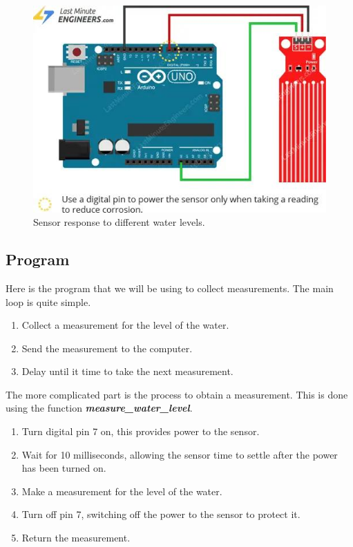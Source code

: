 \documentclass[12pt]{article}
\begin{document}
\begin{figure}[H]
	\begin{center}
		\includegraphics[scale=0.55]{circuit_water_sensor_basic}
		\caption{Sensor response to different water levels.}
		\label{circuit:water_sensor_basic}
	\end{center}
\end{figure}














\subsection{Program}

Here is the program that we will be using to collect measurements. The main loop is quite simple.

\begin{enumerate}
	\itemsep -1em
	\item Collect a measurement for the level of the water.
	\item Send the measurement to the computer.
	\item Delay until it time to take the next measurement.
\end{enumerate}

The more complicated part is the process to obtain a measurement. This is done using the function \textbf{\textit{ measure\_water\_level}}.

\begin{enumerate}
	\itemsep -1em
	\item Turn digital pin 7 on, this provides power to the sensor.
	\item Wait for 10 milliseconds, allowing the sensor time to settle after the power has been turned on.
	\item Make a measurement for the level of the water.
	\item Turn off pin 7, switching off the power to the sensor to protect it.
	\item Return the measurement.
\end{enumerate}
\end{document}
